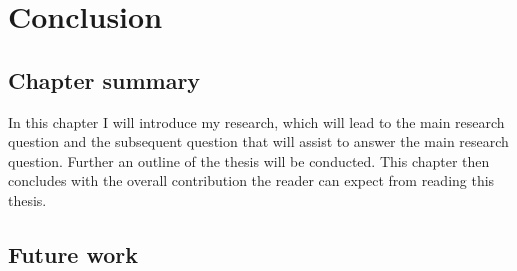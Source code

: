\chapter{Conclusion}
\label{chapterlabel7}

\section*{Chapter summary}

In this chapter I will introduce my research, which will lead to the main research question and the subsequent question that will assist to answer the main research question. Further an outline of the thesis will be conducted. This chapter then concludes with the overall contribution the reader can expect from reading this thesis.\newpage


\section{Future work}

\blindtext

